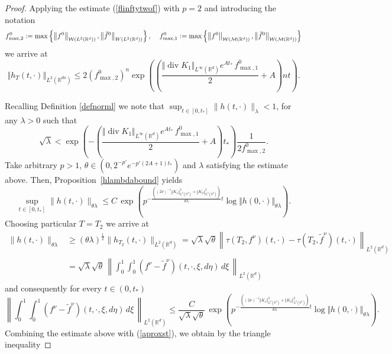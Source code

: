 \documentclass[10pt]{article}
\def\divv{\operatorname {div}}
\newcommand{\hd}{\hspace{0.2cm}}
\newcommand*{\norm}[1]{\left\Vert{#1}\right\Vert}
\newcommand{\R}{\mathbb{R}}
\newcommand{\W}{\mathcal{W}}
\begin{document}
\begin{proof}
Applying the estimate (\ref{flinftytwof}) with $p=2$ and introducing the notation
\[
f^0_{\text{max},2}:=\max\left\{\norm{f^0}_{\W(L^2(\R^d))},\norm{\tilde{f}^0}_{W(L^2(\R^d))} \right\}, \hd \hd f^0_{\text{max},1}:=\max\left\{\norm{f^0}_{\W(\mathcal{M}(\R^d))},\norm{\tilde{f}^0}_{\W(\mathcal{M}(\R^d))}\right \}
\]
we arrive at
\[
\norm{h_T(t,\cdot)}_{L^2(\R^{d n})}\leq 2(f^0_{\max,2})^{n} \exp\left(\left(\frac{\Vert \divv K_1\Vert_{L^\infty(\R^d)}e^{At_*}\,f^0_{\max,1}}{2}+A \right)nt\right).
\]


Recalling Definition \ref{defnorml} we note that $\sup_{t\in [0, t_*]}\|h(t,\cdot)\|_\lambda<1$, for any $\lambda>0$ such that
\[
\sqrt{\lambda}<\exp\left(-\left(\frac{\Vert \divv K_1\Vert_{L^\infty(\R^d)}e^{At_*}\,f^0_{\max,1}}{2}+A \right)t_{*}\right)\frac{1}{2f^0_{\max,2}}.
\]
Take arbitrary $p>1$, $\theta\in (0,2^{-p'}e^{-p'(2A+1)t_*})$ and  $\lambda$ satisfying the estimate above.  Then, Proposition~\ref{hlambdabound} yields 
  \[
\sup_{t\in [0, t_*]}\|h(t,\cdot)\|_{\theta\lambda}\leq C\,\exp\left(p^{-\frac{\left((2\nu)^{-1}\norm{K_1}_{L^{2}(\R^d)}^2  + \norm{K_2}_{L^{2}(\R^d)}^2\right)}{\theta\lambda}t}\log \Vert h(0,\cdot)\Vert_{\theta\lambda}\right).
  \]
Choosing particular $T=T_2$ we arrive at 
  \begin{align*}
   \|h(t,\cdot)\|_{\theta\lambda}&\geq (\theta\lambda)^{\frac{1}{2}} \|h_{T_2}(t,\cdot)\|_{L^2(\R^d)}=\sqrt{\lambda}\sqrt{\theta} \left\|\tau(T_2, f^\nu)(t,\cdot)-\tau(T_2,\tilde f^\nu)(t,\cdot)\right\|_{L^2(\R^d)}   \\
   & =\sqrt{\lambda}\sqrt{\theta}\,\left\| \int_0^1\int_0^1 ( f^\nu -\tilde f^\nu) (t,\cdot, \xi,d\eta)\,d\xi\,\right\|_{L^2(\R^d)}
  \end{align*}
  and consequently for every $t \in (0,t_{*})$
  \[
\left\| \int_0^1 \int_0^1 ( f^\nu -\tilde f^\nu) (t,\cdot, \xi,d\eta)\,d\xi\,\right\|_{L^2(\R^d)} \leq \frac{C}{\sqrt{\lambda}\sqrt{\theta}}\,\exp\left(p^{-\frac{\left((2\nu)^{-1}\norm{K_1}_{L^{2}(\R^d)}^2  + \norm{K_2}_{L^{2}(\R^d)}^2\right)}{\theta\lambda}t}\log \Vert h(0,\cdot)\Vert_{\theta\lambda}\right).\]
Combining the estimate above with (\ref{aproxst}), we obtain by the triangle inequality


\end{proof}
\end{document}

